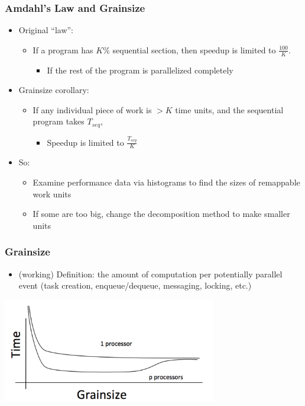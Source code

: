 \begin{frame}
  \frametitle{Amdahl’s Law and Grainsize}
  \begin{itemize}
    \item Original ``law'':
      \begin{itemize}
      \item If a program has $K$\% sequential section, then speedup is limited
        to $\frac{100}{K}$.
        \begin{itemize}
        \item If the rest of the program is parallelized completely
        \end{itemize}
      \end{itemize}
    \item Grainsize corollary:
      \begin{itemize}
      \item If any individual piece of work is $> K$ time units, and the
        sequential program takes $T_{seq}$, 
        \begin{itemize}
        \item Speedup is limited to $\frac{T_{seq}}{K}$
        \end{itemize}
      \end{itemize}
    \item So:
      \begin{itemize}
      \item Examine performance data via histograms to find the sizes of
        remappable work units
      \item If some are too big, change the decomposition method to make
        smaller units
      \end{itemize}
  \end{itemize}
\end{frame}

\begin{frame}
  \frametitle{Grainsize}
  \begin{itemize}
    \item (working) Definition: the amount of computation per potentially
      parallel event (task creation, enqueue/dequeue, messaging,
      locking, etc.)
  \end{itemize}
  \begin{center} \includegraphics[width=0.7\textwidth]{figures/grain1.png} \end{center}
\end{frame}

